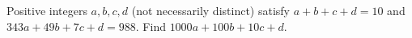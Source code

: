 Positive integers $a,b,c,d$ (not necessarily distinct) satisfy $a+b+c+d=10$ and $343a+49b+7c+d=988$. Find $1000a+100b+10c+d$.
